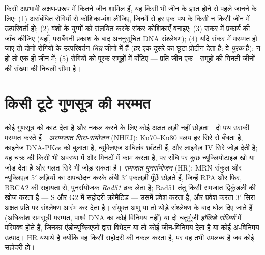 \begin{method}[किसी मरम्मत-रोग को जीनों में छाँटना]\label{met:b3:dna-repair:complementation}
किसी अप्रभावी लक्षण-प्ररूप में कितने जीन शामिल हैं, यह किसी भी जीन के
ज्ञात होने से पहले जानने के लिए: (1) असंबंधित रोगियों से कोशिका-वंश
लीजिए, जिनमें से हर एक पथ के किसी न किसी जीन में उत्परिवर्ती हो;
(2) वंशों के युग्मों को संलयित करके संकर कोशिकाएँ बनाइए; (3) संकर में
प्रकार्य की जाँच कीजिए (यहाँ, पराबैंगनी प्रकाश के बाद अननुसूचित DNA
संश्लेषण); (4) यदि संकर में मरम्मत हो जाए तो दोनों रोगियों के
उत्परिवर्तन \emph{भिन्न} जीनों में हैं (हर एक दूसरे का छूटा प्रोटीन
देता है: वे \emph{पूरक} हैं); न हो तो एक ही जीन में; (5) रोगियों को
पूरक समूहों में बाँटिए --- प्रति जीन एक। समूहों की गिनती जीनों की
संख्या की निचली सीमा है।
\end{method}

\section{किसी टूटे गुणसूत्र की मरम्मत}

\begin{definition}[द्विलड़ी विखंडन की मरम्मत]\label{def:b3:dna-repair:dsb}
कोई \emph{} गुणसूत्र को काट देता है और नकल करने के लिए
कोई अक्षत लड़ी नहीं छोड़ता। दो पथ उसकी मरम्मत करते हैं। \emph{असमजात
सिरा-संयोजन} (NHEJ): Ku70--Ku80 वलय हर सिरे से बँधता है, काइनेज़
DNA-PKcs को बुलाता है, न्यूक्लिएज़ अधिलंब छाँटती हैं, और लाइगेज़ IV
सिरे जोड़ देती है; यह चक्र की किसी भी अवस्था में और मिनटों में काम करता
है, पर संधि पर कुछ न्यूक्लियोटाइड खो या जोड़ देता है और गलत सिरे भी
जोड़ सकता है। \emph{समजात पुनर्संयोजन} (HR): MRN संकुल और
न्यूक्लिएज़ 5$'$ लड़ियों का अपच्छेदन करके लंबी 3$'$ एकलड़ी पूँछें छोड़ते
हैं, जिन्हें RPA और फिर, BRCA2 की सहायता से, पुनर्संयोजक \emph{Rad51}
ढक लेता है; Rad51 तंतु किसी समजात द्विकुंडली की खोज करता है --- S और G2
में सहोदरी क्रोमैटिड --- उसमें प्रवेश करता है, और प्रवेश करता 3$'$ सिरा
अक्षत प्रति पर संश्लेषण आरंभ कर देता है। संयुक्त अणु या तो थोड़े
संश्लेषण के बाद घोल दिए जाते हैं (अधिकांश समसूत्री मरम्मत, पार्श्व DNA
का कोई विनिमय नहीं) या दो चतुर्भुजी \emph{हॉलिडे संधियों} में परिपक्व
होते हैं, जिनका एंडोन्यूक्लिएज़ों द्वारा विभेदन या तो कोई जीन-विनिमय
देता है या कोई अ-विनिमय उत्पाद। HR यथार्थ है क्योंकि वह किसी सहोदरी की
नकल करता है, पर वह तभी उपलब्ध है जब कोई सहोदरी हो।
\end{definition}

